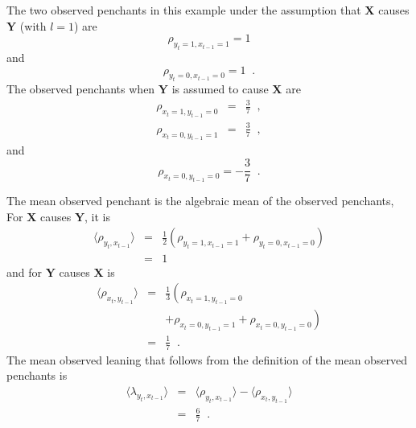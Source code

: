 \documentclass{article}[10pt]
\begin{document}
The two observed penchants in this example under the assumption that $\mathbf{X}$ causes $\mathbf{Y}$ (with $l=1$) are
\begin{equation}
\label{eqn:rhoex1}
\rho_{y_t=1,x_{t-1}=1}=1
\end{equation}
and
\begin{equation*}
\rho_{y_t=0,x_{t-1}=0}=1\;\;.
\end{equation*}
The observed penchants when $\mathbf{Y}$ is assumed to cause $\mathbf{X}$ are
\begin{eqnarray*}
\rho_{x_t=1,y_{t-1}=0} &=& \frac{3}{7}\;\;,\\
\rho_{x_t=0,y_{t-1}=1} &=& \frac{3}{7}\;\;,
\end{eqnarray*}
and
\begin{equation*}
\rho_{x_t=0,y_{t-1}=0}=-\frac{3}{7}\;\;.
\end{equation*}

The mean observed penchant is the algebraic mean of the observed penchants,  For $\mathbf{X}$ causes $\mathbf{Y}$, it is
\begin{eqnarray*}
\langle \rho_{y_t,x_{t-1}} \rangle &=& \frac{1}{2}\left(\rho_{y_t=1,x_{t-1}=1} + \rho_{y_t=0,x_{t-1}=0}\right)\\
&=& 1
\end{eqnarray*}
and for $\mathbf{Y}$ causes $\mathbf{X}$ is
\begin{eqnarray*}
\langle \rho_{x_t,y_{t-1}} \rangle &=& \frac{1}{3}\left(\rho_{x_t=1,y_{t-1}=0} \right.\\
& &\left. +\rho_{x_t=0,y_{t-1}=1} + \rho_{x_t=0,y_{t-1}=0}\right)\\
&=& \frac{1}{7}\;\;.
\end{eqnarray*}
The mean observed leaning that follows from the definition of the mean observed penchants is
\begin{eqnarray}
\label{eqn:meanlean}
\langle \lambda_{y_t,x_{t-1}} \rangle &=& \langle \rho_{y_t,x_{t-1}} \rangle - \langle \rho_{x_t,y_{t-1}} \rangle\\
&=& \frac{6}{7}\;\;.
\end{eqnarray}
\end{document}
